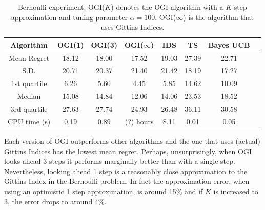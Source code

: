 \begin{table}[h!]
	\centering
	\begin{tabular}{| c| c | c | c | c | c | c | c |} \hline
		\textbf{Algorithm} & \textbf{OGI(1)} & \textbf{OGI(3)} &  \textbf{OGI($\infty$)} & \textbf{IDS} & \textbf{TS} & \textbf{Bayes UCB}  \\ \hline
		Mean Regret &  18.12 & 18.00 & 17.52 & 19.03 & 27.39 & 22.71 \\ \hline
		S.D. & 20.71 & 20.37 &  21.40 & 21.42 & 18.19 & 17.27 \\ \hline
		1st quartile & 6.26 & 5.60 & 4.45 & 5.85 & 14.62 & 10.09 \\ \hline
		Median & 15.08 & 14.84 &12.06 & 14.06 & 23.53 & 18.52 \\ \hline
		3rd quartile & 27.63 & 27.74 & 24.93 & 26.48 & 36.11 & 30.58 \\ \hline
		CPU time (s) & 0.19 & 0.89 & (?) hours & 8.11 & 0.01 & 0.05  \\ \hline
	\end{tabular}
	\caption[Table caption text]{Bernoulli experiment. OGI($K$) denotes the OGI algorithm with a $K$ step approximation and tuning parameter $\alpha = 100$. OGI($\infty$) is the algorithm that uses Gittins Indices.}
	\label{table:bernoulli_experiment1}
\end{table}
Each version of OGI outperforms other algorithms and the one that uses (actual) Gittins Indices has the lowest mean regret. Perhaps, unsurprisingly, when OGI  looks ahead 3 steps it performs marginally better than with a single step. Nevertheless, looking ahead 1 step is a reasonably close approximation to the Gittins Index in the Bernoulli problem. In fact the approximation error, when using an optimistic 1 step approximation, is around 15\% and if $K$ is increased to 3, the error drops to around 4\%.

